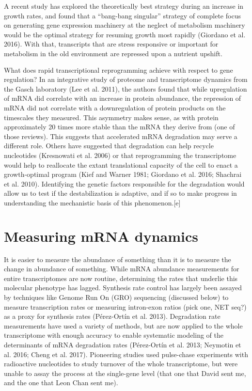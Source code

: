 A recent study has
explored the theoretically best strategy during an increase in growth
rates, and found that a “bang-bang singular” strategy of complete
focus on generating gene expression machinery at the neglect of
metabolism machinery would be the optimal strategy for resuming growth
most rapidly (Giordano et al. 2016). With that, transcripts that are
stress responsive or important for metabolism in the old environment
are repressed upon a nutrient upshift.  

What does rapid transcriptional reprogramming achieve with respect to gene regulation?
In an integrative study of proteome and transcriptome dynamics from
the Gasch laboratory (Lee et al. 2011), the authors found that while
upregulation of mRNA did correlate with an increase in protein
abundance, the repression of mRNA did not correlate with a
downregulation of protein products on the timescales they measured.
This asymmetry makes sense, as with protein approximately 20 times
more stable than the mRNA they derive from (one of those reviews).
This suggests that accelerated mRNA degradation may serve a different
role. Others have suggested that degradation can help recycle
nucleotides (Kresnowati et al. 2006) or that reprogramming the
transcriptome would help to reallocate the extant translational
capacity of the cell to enact a growth-optimal program (Kief and
Warner 1981; Giordano et al. 2016; Shachrai et al. 2010). Identifying
the genetic factors responsible for the degradation would allow us to
test if the destabilization is adaptive, and if so to make progress in
understanding the mechanistic basis of this phenomenon.[e] 

\section{Measuring mRNA dynamics}

It is easier to measure the abundance of something than
it is to measure the change in abundance of something. While mRNA
abundance measurements for entire transcriptomes are now routine,
determining the rates that underlie this molecular phenotype has
lagged. Synthesis rate control has largely been assayed by techniques
like Genome Run On (GRO) sequencing (discussed below) to measure
transcription rates or measuring intron-exon ratios (pick one, NET
seq?) as a proxy for synthesis rates (Pérez-Ortín et al. 2013).
Degradation rate measurements have used a variety of methods, but are
now applied to the whole transcriptome with enough accuracy to enable
systematic modeling of the determinants of mRNA degradation rates
(Pérez-Ortín et al. 2013; Neymotin et al. 2016; Cheng et al. 2017).
Pioneering studies used pulse-chase experiments with radioactive
nucleotides to study turnover of the whole transcriptome, but were
unable to assay the process at the single-gene level (that one that
David sent me, and the one that Leon Chan sent me).  

